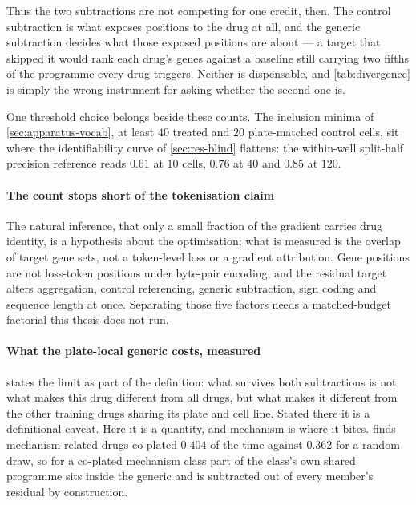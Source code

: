   Thus the two subtractions are not competing for one credit, then. The control
  subtraction is what exposes positions to the drug at all, and the generic
  subtraction decides what those exposed positions are about --- a target that
  skipped it would rank each drug's genes against a baseline still carrying two
  fifths of the programme every drug triggers. Neither is dispensable, and
  \cref{tab:divergence} is simply the wrong instrument for asking whether the second
  one is.
  
  One threshold choice belongs beside these counts. The inclusion minima of
  \cref{sec:apparatus-vocab}, at least $40$ treated and $20$ plate-matched control
  cells, sit where the identifiability curve of \cref{sec:res-blind} flattens: the
  within-well split-half precision reference reads $0.61$ at $10$ cells, $0.76$ at
  $40$ and $0.85$ at $120$.
  
  \paragraph{The count stops short of the tokenisation claim} The natural inference,
  that only a small fraction of the gradient carries drug identity, is a hypothesis
  about the optimisation; what is measured is the overlap of target gene sets, not a
  token-level loss or a gradient attribution. Gene positions are not loss-token
  positions under byte-pair encoding, and the residual target alters aggregation,
  control referencing, generic subtraction, sign coding and sequence length at once.
  Separating those five factors needs a matched-budget factorial this thesis does not
  run.
  
  
  \paragraph{What the plate-local generic costs, measured}
   states the limit as part of the definition: what
  survives both subtractions is not what makes this drug different from all drugs,
  but what makes it different from the other training drugs sharing its plate and
  cell line. Stated there it is a definitional caveat. Here it is a quantity, and
  mechanism is where it bites.  finds mechanism-related drugs
  co-plated $0.404$ of the time against $0.362$ for a random draw, so for a co-plated
  mechanism class part of the class's own shared programme sits inside the generic
  and is subtracted out of every member's residual by construction.
  
